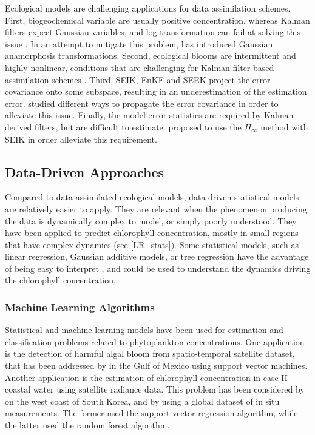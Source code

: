 Ecological models are challenging applications for data assimilation schemes. First, biogeochemical variable are usually positive concentration, whereas Kalman filters expect Gaussian variables, and log-transformation can fail at solving this issue \citep{Ciavatta2011}. In an attempt to mitigate this problem, \citet{Fontana2013} has introduced Gaussian anamorphosis transformations. Second, ecological blooms are intermittent and highly nonlinear, conditions that are challenging for Kalman filter-based assimilation schemes \citep{Triantafyllou2012, Korres2012}. Third, SEIK, EnKF and SEEK project the error covariance onto some subspace, resulting in an underestimation of the estimation error. \citet{Butenschon2012} studied different ways to propagate the error covariance in order to alleviate this issue. Finally, the model error statistics are required by Kalman-derived filters, but are difficult to estimate. \citet{Triantafyllou2012} proposed to use the $H_\infty$ method with SEIK in order alleviate this requirement.

\subsection{Data-Driven Approaches}

Compared to data assimilated ecological models, data-driven statistical models are relatively easier to apply. They are relevant when the phenomenon producing the data is dynamically complex to model, or simply poorly understood. They have been applied to predict chlorophyll concentration, mostly in small regions that have complex dynamics (see \ref{LR_stats}). Some statistical models, such as linear regression, Gaussian additive models, or tree regression have the advantage of being easy to interpret \citep{Gareth2013}, and could be used to understand the dynamics driving the chlorophyll concentration.

\subsubsection{Machine Learning Algorithms}

Statistical and machine learning models have been used for estimation and classification problems related to phytoplankton concentrations. One application is the detection of harmful algal bloom from spatio-temporal satellite dataset, that has been addressed by \citet{Gokaraju2011} in the Gulf of Mexico using support vector machines. Another application is the estimation of chlorophyll concentration in case II coastal water using satellite radiance data. This problem has been considered by \citet{Kim2014} on the west coast of South Korea, and by \citet{Camps-Valls2006} using a global dataset of in situ measurements. The former used the support vector regression algorithm, while the latter used the random forest algorithm.

